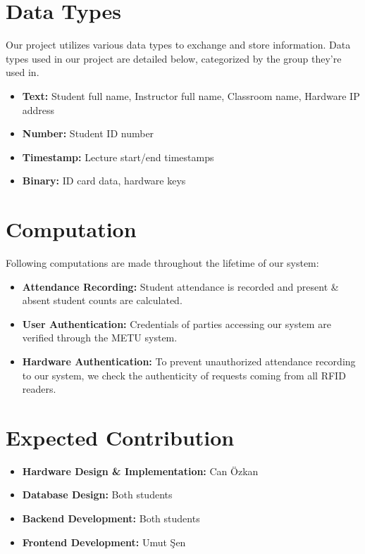 \documentclass[12pt]{article}
\begin{document}
\newpage
\section{Data Types}
Our project utilizes various data types to exchange and store information. Data types used in our project are detailed below, categorized by the group they’re used in.

\begin{itemize}
    \item \textbf{Text:} Student full name, Instructor full name, Classroom name, Hardware IP address
    \item \textbf{Number:} Student ID number
    \item \textbf{Timestamp:} Lecture start/end timestamps
    \item \textbf{Binary:} ID card data, hardware keys
\end{itemize}



\section{Computation}
Following computations are made throughout the lifetime of our system:

\begin{itemize}
    \item \textbf{Attendance Recording:} Student attendance is recorded and present \& absent student counts are calculated.
    \item \textbf{User Authentication:} Credentials of parties accessing our system are verified through the METU system.
    \item \textbf{Hardware Authentication:} To prevent unauthorized attendance recording to our system, we check the authenticity of requests coming from all RFID readers.
\end{itemize}



\section{Expected Contribution}
\begin{itemize}
    \item \textbf{Hardware Design \& Implementation:} Can Özkan
    \item \textbf{Database Design:} Both students
    \item \textbf{Backend Development:} Both students
    \item \textbf{Frontend Development:} Umut Şen
\end{itemize}
\end{document}
